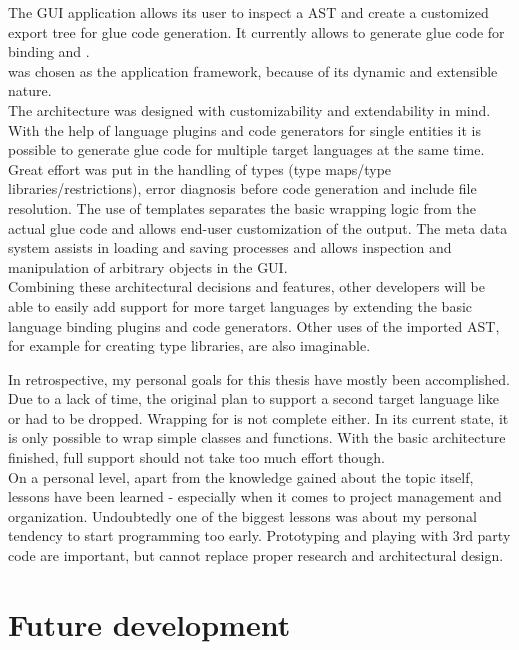 The  GUI application allows its user to inspect a  AST and create a customized export tree for glue code generation. It currently allows to generate glue code for binding  and .\\
 was chosen as the application framework, because of its dynamic and extensible nature.\\
The architecture was designed with customizability and extendability in mind. With the help of language plugins and code generators for single  entities it is possible to generate glue code for multiple target languages at the same time. Great effort was put in the handling of types (type maps/type libraries/restrictions), error diagnosis before code generation and include file resolution. The use of templates separates the basic wrapping logic from the actual glue code and allows end-user customization of the output. The meta data system assists in loading and saving processes and allows inspection and manipulation of arbitrary  objects in the GUI.\\
Combining these architectural decisions and features, other developers will be able to easily add support for more target languages by extending the basic language binding plugins and code generators. Other uses of the imported  AST, for example for creating type libraries, are also imaginable.

In retrospective, my personal goals for this thesis have mostly been accomplished.\\
Due to a lack of time, the original plan to support a second target language like  or  had to be dropped. Wrapping for  is not complete either. In its current state, it is only possible to wrap simple classes and functions. With the basic architecture finished, full support should not take too much effort though.\\
On a personal level, apart from the knowledge gained about the topic itself, lessons have been learned - especially when it comes to project management and organization. Undoubtedly one of the biggest lessons was about my personal tendency to start programming too early. Prototyping and playing with 3rd party code are important, but cannot replace proper research and architectural design.

\chapter{Future development}

